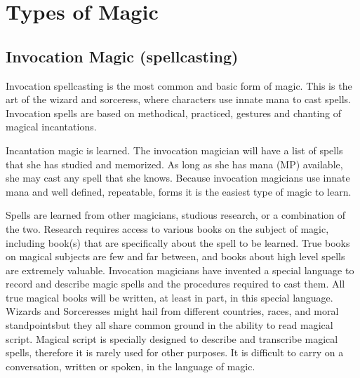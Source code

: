 \documentclass[twoside]{book}
\begin{document}
    

\section{Types of Magic}
    
    

\subsection{Invocation Magic (spellcasting)}
    
    {  
      Invocation spellcasting is the most common and
               basic form of magic. This is the art of the wizard and
               sorceress, where characters use innate mana to cast
               spells. Invocation spells are based on methodical,
               practiced, gestures and chanting of magical incantations.
               
    }
  
    {  
      Incantation magic is learned. The invocation
               magician will have a list of spells that she has studied
               and memorized. As long as she has mana (MP) available, she
               may cast any spell that she knows. Because invocation
               magicians use innate mana and well defined, repeatable,
               forms it is the easiest type of magic to learn. 
    }
  
    {  
      Spells are learned from other magicians, studious
               research, or a combination of the two. Research requires
               access to various books on the subject of magic, including
               book(s) that are specifically about the spell to be
               learned. True books on magical subjects are few and far
               between, and books about high level spells are extremely
               valuable. Invocation magicians have invented a special
               language to record and describe magic spells and the
               procedures required to cast them. All true magical books
               will be written, at least in part, in this special
               language. Wizards and Sorceresses might hail from
               different countries, races, and moral
               standpointsbut they all share common ground in the
               ability to read magical script. Magical script is
               specially designed to describe and transcribe magical
               spells, therefore it is rarely used for other purposes. It
               is difficult to carry on a conversation, written or
               spoken, in the language of magic. 
    }
  
\end{document}
